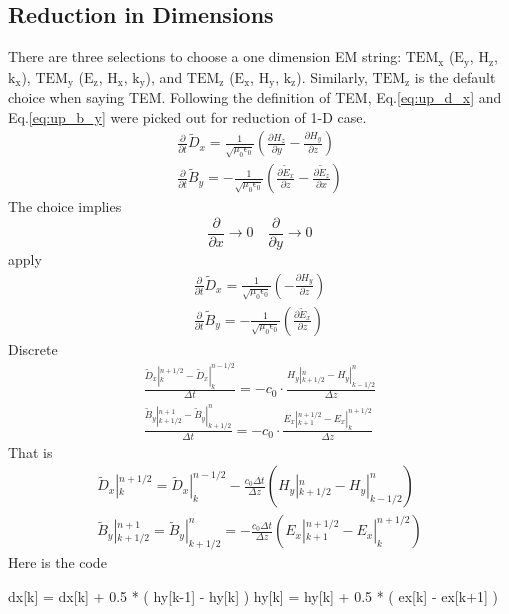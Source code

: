 \subsection{Reduction in Dimensions}
There are three selections to choose a one dimension EM string: $\mathrm{TEM_x}$ ($\mathrm{E_{y}}$, $\mathrm{H_{z}}$,
$\mathrm{k_x}$), $\mathrm{TEM_y}$ ($\mathrm{E_z}$, $\mathrm{H_x}$, $\mathrm{k_y}$), and $\mathrm{TEM_z}$
($\mathrm{E_x}$, $\mathrm{H_y}$, $\mathrm{k_z}$). Similarly, $\mathrm{TEM_z}$ is the default choice when saying
TEM. Following the definition of TEM, Eq.\ref{eq:up_d_x} and Eq.\ref{eq:up_b_y} were picked out for reduction of 1-D
case.
\begin{gather*}
  \frac{\partial}{\partial t}\widetilde{D}_x = \frac{1}{\sqrt{\mu_0\epsilon_0}}\left(\frac{\partial H_z}{\partial y} - \frac{\partial H_y}{\partial z}\right)\\
  \frac{\partial}{\partial t}\widetilde{B}_y =-\frac{1}{\sqrt{\mu_0\epsilon_0}}\left(\frac{\partial \widetilde{E}_x}{\partial z} - \frac{\partial \widetilde{E}_z}{\partial x}\right)
\end{gather*}
The choice implies
\begin{displaymath}
  \frac{\partial}{\partial x} \rightarrow 0\quad
  \frac{\partial}{\partial y} \rightarrow 0
\end{displaymath}
apply
\begin{gather}
  \frac{\partial}{\partial t}\widetilde{D}_x = \frac{1}{\sqrt{\mu_0\epsilon_0}}\left( - \frac{\partial H_y}{\partial z}\right)\\
  \frac{\partial}{\partial t}\widetilde{B}_y =-\frac{1}{\sqrt{\mu_0\epsilon_0}}\left(\frac{\partial \widetilde{E}_x}{\partial z} \right)
\end{gather}
Discrete
\begin{gather}
  \frac{\widetilde{D}_x|_k^{n+1/2} - \widetilde{D}_x|_k^{n-1/2}}{\Delta t} = -c_0\cdot\frac{H_y|_{k+1/2}^n - H_y|_{k-1/2}^n}{\Delta z}\\
  \frac{\widetilde{B}_y|_{k+1/2}^{n+1} - \widetilde{B}_y|_{k+1/2}^n}{\Delta t} = -c_0\cdot\frac{E_x|_{k+1}^{n+1/2} - E_x|_{k}^{n+1/2}}{\Delta z}
\end{gather}
That is
\begin{gather}
  \widetilde{D}_x|_k^{n+1/2} = \widetilde{D}_x|_k^{n-1/2} - \frac{c_0\Delta t}{\Delta z}\left( H_y|_{k+1/2}^n - H_y|_{k-1/2}^n \right)\\
  \widetilde{B}_y|_{k+1/2}^{n+1} = \widetilde{B}_y|_{k+1/2}^{n} = - \frac{c_0\Delta t}{\Delta z}\left( E_x|_{k+1}^{n+1/2} - E_x|_{k}^{n+1/2} \right)
\end{gather}
Here is the code
\begin{code}
  dx[k] = dx[k] + 0.5 * ( hy[k-1] - hy[k] )
  hy[k] = hy[k] + 0.5 * ( ex[k] - ex[k+1] )
\end{code}





